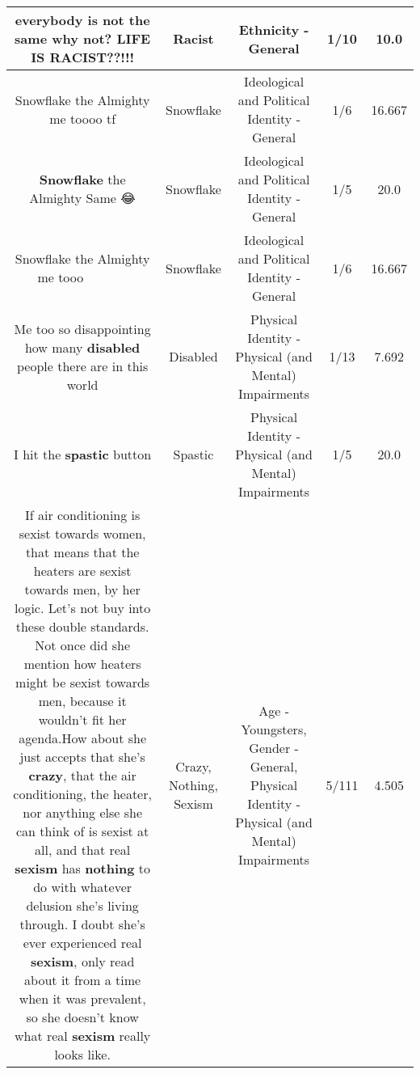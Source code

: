 \documentclass[11pt]{article}
\newlength\mylength
\begin{document}
\begin{center}
\begin{longtable}{|C{.65\mylength}|C{.30\mylength}|C{.12\mylength}|C{.12\mylength}|C{.12\mylength}|}
  \small everybody is not the same why not? LIFE IS \textbf{RACIST}??!!!\normalsize   & Racist & Ethnicity - General & 1/10 & 10.0 \\  \hline
  \small Snowflake the Almighty me toooo tf\normalsize   & Snowflake &  Ideological and Political Identity - General & 1/6 & 16.667 \\  \hline
  \small \@\textbf{Snowflake} the Almighty Same 😂\normalsize   & Snowflake &  Ideological and Political Identity - General & 1/5 & 20.0 \\  \hline
  \small Snowflake the Almighty me tooo 🤣🤣🤣🤣😂😂😂😂🤣🤣🤣\normalsize   & Snowflake &  Ideological and Political Identity - General & 1/6 & 16.667 \\  \hline
  \small Me too so disappointing how many \textbf{disabled} people there are in this world\normalsize   & Disabled & Physical Identity - Physical (and Mental) Impairments & 1/13 & 7.692 \\  \hline
  \small I hit the \textbf{spastic} button\normalsize   & Spastic & Physical Identity - Physical (and Mental) Impairments & 1/5 & 20.0 \\  \hline
  \small If air conditioning is sexist towards women, that means that the heaters are sexist towards men, by her logic. Let's not buy into these double standards. Not once did she mention how heaters might be sexist towards men, because it wouldn't fit her agenda.How about she just accepts that she's \textbf{crazy}, that the air conditioning, the heater, nor anything else she can think of is sexist at all, and that real \textbf{sexism} has \textbf{nothing} to do with whatever delusion she's living through. I doubt she's ever experienced real \textbf{sexism}, only read about it from a time when it was prevalent, so she doesn't know what real \textbf{sexism} really looks like.\normalsize   & Crazy, Nothing, Sexism & Age - Youngsters, Gender - General, Physical Identity - Physical (and Mental) Impairments & 5/111 & 4.505 \\  \hline

\end{longtable}
\end{center}
\end{document}
